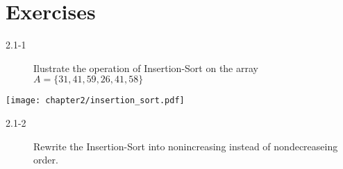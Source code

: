 \section*{Exercises}

\begin{description}
 \item[2.1-1] Ilustrate the operation of Insertion-Sort on the array $A = \{31,41,59,26,41,58\}$
\end{description}
\begin{center}
 \texttt{[image: chapter2/insertion\_sort.pdf]}
\end{center}

\begin{description}
 \item[2.1-2] Rewrite the Insertion-Sort into nonincreasing instead of nondecreaseing order.
\end{description}

